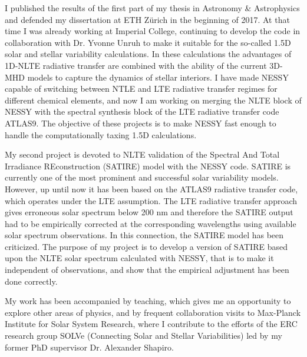 \documentclass[11pt, a4paper]{awesome-cv}
\begin{document}
\begin{cvletter}
I published the results of the first part of my thesis in Astronomy \& Astrophysics 
and defended my dissertation at ETH Z{\"u}rich in the beginning of 2017.
At that time I was already working at Imperial College, continuing to develop
the code in collaboration with Dr. Yvonne Unruh to make it suitable
for the so-called 1.5D solar and stellar variability calculations. 
In these calculations the advantages of 1D-NLTE radiative transfer are
combined with the ability of the current 3D-MHD models to capture the dynamics of stellar interiors.
I have made NESSY capable of switching between NTLE and LTE radiative transfer regimes for different chemical elements,
and now I am working on merging the NLTE block of NESSY with the spectral synthesis block of the LTE radiative transfer code ATLAS9.
The objective of these projects is to make NESSY fast enough to handle the computationally taxing 1.5D calculations.

My second project is devoted to NLTE validation of the Spectral And Total Irradiance REconstruction (SATIRE)
model with the NESSY code.
SATIRE is currently one of the most prominent and successful solar variability models.
However, up until now it has been based on the ATLAS9 radiative transfer code, which operates under the LTE assumption.
The LTE radiative transfer approach gives erroneous solar spectrum below 200 nm and therefore the SATIRE output had to be
empirically corrected at the corresponding wavelengths using available solar spectrum observations.
In this connection, the SATIRE model has been criticized.
The purpose of my project is to develop a version of SATIRE based upon the NLTE solar spectrum calculated with NESSY,
that is to make it independent of observations, and show that the empirical adjustment has been done correctly.

My work has been accompanied by teaching, which gives me an opportunity to explore other areas of physics,
and by frequent collaboration visits to Max-Planck Institute for Solar System Research,
where I contribute to the efforts of the ERC research group SOLVe (Connecting Solar and Stellar Variabilities)
led by my former PhD supervisor Dr. Alexander Shapiro.



\end{cvletter}
\end{document}
